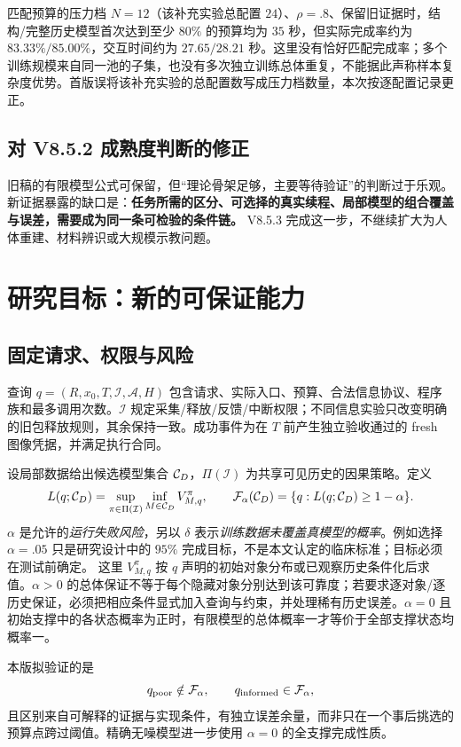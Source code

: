 \documentclass[11pt,a4paper,fontset=fandol]{ctexart}
\theoremstyle{definition}
\theoremstyle{remark}\newtheorem{remark}[theorem]{说明}
\numberwithin{equation}{section}
\begin{document}
匹配预算的压力档 $N=12$（该补充实验总配置 $24$）、$\rho=.8$、保留旧证据时，结构/完整历史模型首次达到至少 $80\%$ 的预算均为 $35$ 秒，但实际完成率约为 $83.33\%/85.00\%$，交互时间约为 $27.65/28.21$ 秒。这里没有恰好匹配完成率；多个训练规模来自同一池的子集，也没有多次独立训练总体重复，不能据此声称样本复杂度优势\cite{budgetdata}。首版误将该补充实验的总配置数写成压力档数量，本次按逐配置记录更正。

\subsection{对 V8.5.2 成熟度判断的修正}
旧稿的有限模型公式可保留，但“理论骨架足够，主要等待验证”的判断过于乐观。新证据暴露的缺口是：\textbf{任务所需的区分、可选择的真实续程、局部模型的组合覆盖与误差，需要成为同一条可检验的条件链。} V8.5.3 完成这一步，不继续扩大为人体重建、材料辨识或大规模示教问题。

\section{研究目标：新的可保证能力}
\label{sec:goal}
\subsection{固定请求、权限与风险}
查询 $q=(R,x_0,T,\mathcal I,\mathcal A,H)$ 包含请求、实际入口、预算、合法信息协议、程序族和最多调用次数。$\mathcal I$ 规定采集/释放/反馈/中断权限；不同信息实验只改变明确的旧包释放规则，其余保持一致。成功事件为在 $T$ 前产生独立验收通过的 fresh 图像凭据，并满足执行合同。

设局部数据给出候选模型集合 $\mathcal C_D$，$\Pi(\mathcal I)$ 为共享可见历史的因果策略。定义
\begin{equation}
 L(q;\mathcal C_D)=\sup_{\pi\in\Pi(\mathcal I)}\inf_{M\in\mathcal C_D}V_{M,q}^{\pi},
 \qquad
 \mathcal F_\alpha(\mathcal C_D)=\{q:L(q;\mathcal C_D)\ge1-\alpha\}.
 \label{eq:feas}
\end{equation}
$\alpha$ 是允许的\emph{运行失败风险}，另以 $\delta$ 表示\emph{训练数据未覆盖真模型的概率}。例如选择 $\alpha=.05$ 只是研究设计中的 $95\%$ 完成目标，不是本文认定的临床标准；目标必须在测试前确定。
这里 $V_{M,q}^{\pi}$ 按 $q$ 声明的初始对象分布或已观察历史条件化后求值。$\alpha>0$ 的总体保证不等于每个隐藏对象分别达到该可靠度；若要求逐对象/逐历史保证，必须把相应条件显式加入查询与约束，并处理稀有历史误差。$\alpha=0$ 且初始支撑中的各状态概率为正时，有限模型的总体概率一才等价于全部支撑状态均概率一。

本版拟验证的是
\begin{equation}
 q_{\rm poor}\notin\mathcal F_\alpha,
 \qquad q_{\rm informed}\in\mathcal F_\alpha,
 \label{eq:crossing}
\end{equation}
且区别来自可解释的证据与实现条件，有独立误差余量，而非只在一个事后挑选的预算点跨过阈值。精确无噪模型进一步使用 $\alpha=0$ 的全支撑完成性质。
\end{document}
